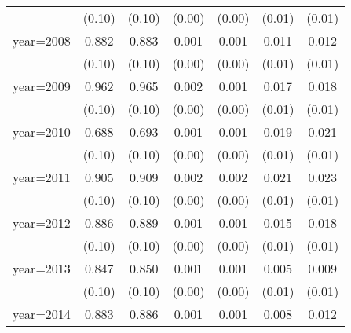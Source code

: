 {\begin{tabular}{l*{6}{c}}
                    &      (0.10)         &      (0.10)         &      (0.00)         &      (0.00)         &      (0.01)         &      (0.01)         \\
year=2008           &       0.882\sym{***}&       0.883\sym{***}&       0.001         &       0.001         &       0.011         &       0.012         \\
                    &      (0.10)         &      (0.10)         &      (0.00)         &      (0.00)         &      (0.01)         &      (0.01)         \\
year=2009           &       0.962\sym{***}&       0.965\sym{***}&       0.002         &       0.001         &       0.017\sym{*}  &       0.018\sym{*}  \\
                    &      (0.10)         &      (0.10)         &      (0.00)         &      (0.00)         &      (0.01)         &      (0.01)         \\
year=2010           &       0.688\sym{***}&       0.693\sym{***}&       0.001         &       0.001         &       0.019\sym{*}  &       0.021\sym{**} \\
                    &      (0.10)         &      (0.10)         &      (0.00)         &      (0.00)         &      (0.01)         &      (0.01)         \\
year=2011           &       0.905\sym{***}&       0.909\sym{***}&       0.002         &       0.002         &       0.021\sym{**} &       0.023\sym{**} \\
                    &      (0.10)         &      (0.10)         &      (0.00)         &      (0.00)         &      (0.01)         &      (0.01)         \\
year=2012           &       0.886\sym{***}&       0.889\sym{***}&       0.001         &       0.001         &       0.015         &       0.018\sym{*}  \\
                    &      (0.10)         &      (0.10)         &      (0.00)         &      (0.00)         &      (0.01)         &      (0.01)         \\
year=2013           &       0.847\sym{***}&       0.850\sym{***}&       0.001         &       0.001         &       0.005         &       0.009         \\
                    &      (0.10)         &      (0.10)         &      (0.00)         &      (0.00)         &      (0.01)         &      (0.01)         \\
year=2014           &       0.883\sym{***}&       0.886\sym{***}&       0.001         &       0.001         &       0.008         &       0.012         \\

\end{tabular}}
